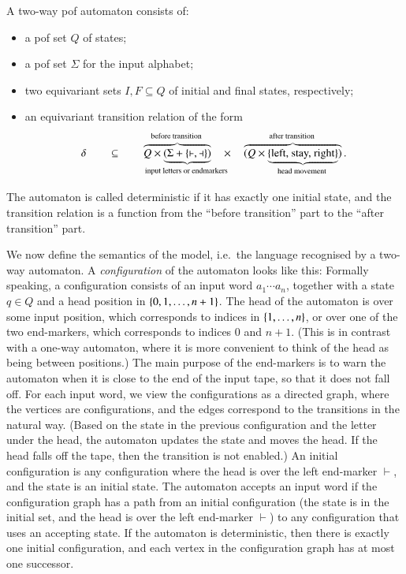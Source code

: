 \begin{definition} 
	A two-way pof automaton consists of: 
	\begin{itemize}
		\item a pof set $Q$ of states;
		\item a pof set $\Sigma$ for the input alphabet;
		\item two equivariant sets $I,F \subseteq Q$ of initial and final states, respectively;
		\item an equivariant transition relation of the form 
		\begin{align*}
\delta \qquad \subseteq \qquad 
\myoverbrace{Q \times 
\myunderbrace{(\Sigma + \set{\vdash,\dashv} )}{input letters or endmarkers}}{before transition}
\quad \times \quad
\myoverbrace{ 
(Q \times 
\myunderbrace{\set{\text{left, stay, right}}}{head movement})}{after transition}.
\end{align*}
	\end{itemize}
The automaton is called deterministic if it has exactly one initial state, and the transition relation is a function from the ``before transition'' part to the ``after transition'' part.
\end{definition}

We now define the semantics of the model, i.e.~the language recognised by a two-way automaton. A \emph{configuration} of the automaton looks like this: 
Formally speaking, a configuration consists of an input word $a_1 \cdots a_n$, together with a state $q \in Q$ and a head position in $\{0,1,\ldots,n+1\}$. 
The head of the automaton is over some input position, which corresponds to indices in $\{1,\ldots,n\}$,  or over one of the two end-markers, which corresponds to indices $0$ and $n+1$. (This is in contrast with a one-way automaton, where it is more convenient to think of the head as being between positions.) The main purpose of the end-markers is to warn the automaton when it is close to the end of the input tape, so that it does not fall off. For each input word, we view the configurations as a directed graph, where the vertices are configurations, and the edges correspond to the transitions in the natural way. (Based on the state in the previous configuration and the letter under the head, the automaton updates the state and moves the head. If the head falls off the tape, then the transition is not enabled.) 
An initial configuration is any configuration where the  head is over the left end-marker $\vdash$, and the state is an initial state. The automaton accepts an input word if the configuration graph has a path from an initial configuration (the state is in the initial set, and the head is over the left end-marker $\vdash$) to any configuration that uses an accepting state. If the automaton is deterministic, then there is exactly one initial configuration, and each vertex in the configuration graph has at most one successor. 

